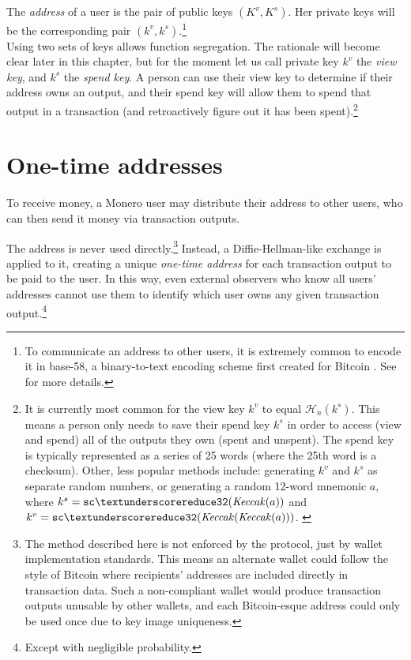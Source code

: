 The {\em address} of a user is the pair of public keys \((K^v, K^s)\). Her private keys will be the corresponding pair \( (k^v, k^s) \).\footnote{To communicate an address to other users, it is extremely common to encode it in base-58, a binary-to-text encoding scheme first created for Bitcoin \cite{base-58-encoding}. See \cite{luigi-address} for more details.}
\\

Using two sets of keys allows function segregation. The rationale will become clear later in this chapter, but for the moment let us call private key $k^v$ the {\em view key}, and $k^s$ the {\em spend key}. A person can use their view key to determine if their address owns an output, and their spend key will allow them to spend that output in a transaction (and retroactively figure out it has been spent).\footnote{It is currently most common for the view key $k^v$ to equal $\mathcal{H}_n(k^s)$. This means a person only needs to save their spend key $k^s$ in order to access (view and spend) all of the outputs they own (spent and unspent). The spend key is typically represented as a series of 25 words (where the 25th word is a checksum). Other, less popular methods include: generating $k^v$ and $k^s$ as separate random numbers, or generating a random 12-word mnemonic $a$, where $k^s = {\tt sc\textunderscore reduce32}(\mathit{Keccak}(a))$ and $k^v = {\tt sc\textunderscore reduce32}(\mathit{Keccak}(\mathit{Keccak}(a)))$. \cite{luigi-address}}



\section{One-time addresses}
\label{sec:one-time-addresses}

To receive money, a Monero user may distribute their address to other users, who can then send it money via transaction outputs.

The address is never used directly.\footnote{The method described here is not enforced by the protocol, just by wallet implementation standards. This means an alternate wallet could follow the style of Bitcoin where recipients' addresses are included directly in transaction data. Such a non-compliant wallet would produce transaction outputs unusable by other wallets, and each Bitcoin-esque address could only be used once due to key image uniqueness.} Instead, a Diffie-Hellman-like exchange is applied to it, creating a unique {\em one-time address} for each transaction output to be paid to the user. In this way, even external observers who know all users’ addresses cannot use them to identify which user owns any given transaction output.\footnote{Except with negligible probability.}

